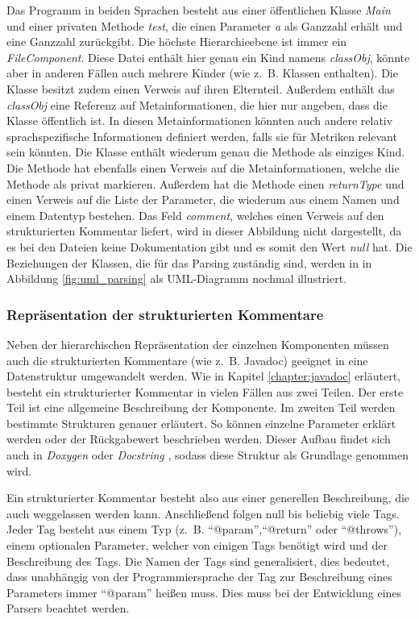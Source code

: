 Das Programm in beiden Sprachen besteht aus einer öffentlichen Klasse \textit{Main} und einer privaten Methode \textit{test}, die einen Parameter \textit{a} als Ganzzahl erhält und eine Ganzzahl zurückgibt. Die höchste Hierarchieebene ist immer ein \textit{FileComponent}. Diese Datei enthält hier genau ein Kind namens \textit{classObj}, könnte aber in anderen Fällen auch mehrere Kinder (wie z.~B. Klassen enthalten). Die Klasse besitzt zudem einen Verweis auf ihren Elternteil. Außerdem enthält das \textit{classObj} eine Referenz auf Metainformationen, die hier nur angeben, dass die Klasse öffentlich ist. In diesen Metainformationen könnten auch andere relativ sprachspezifische Informationen definiert werden, falls sie für Metriken relevant sein könnten. Die Klasse enthält wiederum genau die Methode als einziges Kind. Die Methode hat ebenfalls einen Verweis auf die Metainformationen, welche die Methode als privat markieren. Außerdem hat die Methode einen \textit{returnType} und einen Verweis auf die Liste der Parameter, die wiederum aus einem Namen und einem Datentyp bestehen. Das Feld \textit{comment}, welches einen Verweis auf den strukturierten Kommentar liefert, wird in dieser Abbildung nicht dargestellt, da es bei den Dateien keine Dokumentation gibt und es somit den Wert \textit{null} hat. Die Beziehungen der Klassen, die für das Parsing zuständig sind, werden in in Abbildung \ref{fig:uml_parsing} als UML-Diagramm nochmal illustriert.

\subsubsection{Repräsentation der strukturierten Kommentare}\label{chapter:structured_comments}
Neben der hierarchischen Repräsentation der einzelnen Komponenten müssen auch die strukturierten Kommentare (wie z.~B. Javadoc) geeignet in eine Datenstruktur umgewandelt werden. Wie in Kapitel \ref{chapter:javadoc}
 erläutert, besteht ein strukturierter Kommentar in vielen Fällen aus zwei Teilen. Der erste Teil ist eine allgemeine Beschreibung der Komponente. Im zweiten Teil werden bestimmte Strukturen genauer erläutert. So können einzelne Parameter erklärt werden oder der Rückgabewert beschrieben werden. 
 Dieser Aufbau findet sich auch in \textit{Doxygen} \cite{doxygen} oder \textit{Docstring} \cite{docstring}, sodass diese Struktur als Grundlage genommen wird. 
 
 Ein strukturierter Kommentar besteht also aus einer generellen Beschreibung, die auch weggelassen werden kann. Anschließend folgen null bis beliebig viele Tags. Jeder Tag besteht aus einem Typ (z.~B. \enquote{@param},\enquote{@return} oder \enquote{@throws}), einem optionalen Parameter, welcher von einigen Tags benötigt wird und der Beschreibung des Tags. Die Namen der Tags sind generalisiert, dies bedeutet, dass unabhängig von der Programmiersprache der Tag zur Beschreibung eines Parameters immer \enquote{@param} heißen muss. Dies muss bei der Entwicklung eines Parsers beachtet werden. 
 
